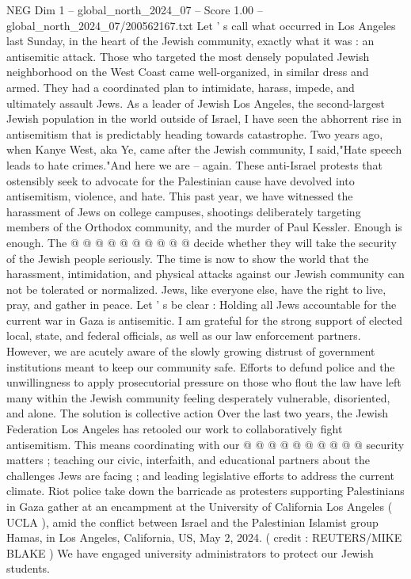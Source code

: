 \begin{textsample}{NEG Dim 1 – global\_north\_2024\_07 – Score 1.00 – global\_north\_2024\_07/200562167.txt}  \label{ex:f1_neg_271}
Let ' s call what occurred in Los Angeles last Sunday, in the heart of the Jewish community, exactly what it was : an antisemitic attack.
Those who targeted the most densely populated Jewish neighborhood on the West Coast came well-organized, in similar dress and armed.
They had a coordinated plan to intimidate, harass, impede, and ultimately assault Jews.
As a leader of Jewish Los Angeles, the second-largest Jewish population in the world outside of Israel, I have seen the abhorrent rise in antisemitism that is predictably heading towards catastrophe.
Two years ago, when Kanye West, aka Ye, came after the Jewish community, I said,"Hate speech leads to hate crimes."And here we are -- again.
These anti-Israel protests that ostensibly seek to advocate for the Palestinian cause have devolved into antisemitism, violence, and hate.
This past year, we have witnessed the harassment of Jews on college campuses, shootings deliberately targeting members of the Orthodox community, and the murder of Paul Kessler.
Enough is enough.
The @ @ @ @ @ @ @ @ @ @ decide whether they will take the security of the Jewish people seriously.
The time is now to show the world that the harassment, intimidation, and physical attacks against our Jewish community can not be tolerated or normalized.
Jews, like everyone else, have the right to live, pray, and gather in peace.
Let ' s be clear : Holding all Jews accountable for the current war in Gaza is antisemitic.
I am grateful for the strong support of elected local, state, and federal officials, as well as our law enforcement partners.
However, we are acutely aware of the slowly growing distrust of government institutions meant to keep our community safe.
Efforts to defund police and the unwillingness to apply prosecutorial pressure on those who flout the law have left many within the Jewish community feeling desperately vulnerable, disoriented, and alone.
The solution is collective action Over the last two years, the Jewish Federation Los Angeles has retooled our work to collaboratively fight antisemitism.
This means coordinating with our @ @ @ @ @ @ @ @ @ @ security matters ; teaching our civic, interfaith, and educational partners about the challenges Jews are facing ; and leading legislative efforts to address the current climate.
Riot police take down the barricade as protesters supporting Palestinians in Gaza gather at an encampment at the University of California Los Angeles ( UCLA ), amid the conflict between Israel and the Palestinian Islamist group Hamas, in Los Angeles, California, US, May 2, 2024. ( credit : REUTERS/MIKE BLAKE ) We have engaged university administrators to protect our Jewish students.

\end{textsample}
